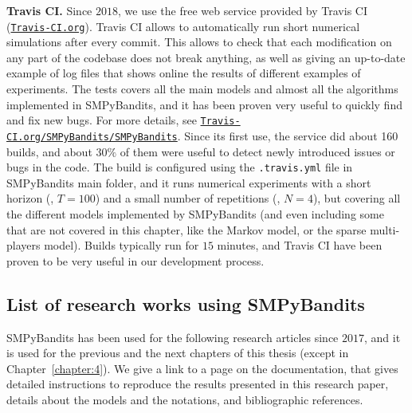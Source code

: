 \textbf{Travis CI.}
Since $2018$, we use the free web service provided by Travis CI (\href{https://travis-ci.org/}{\texttt{Travis-CI.org}}).
Travis CI allows to automatically run short numerical simulations after every commit.
This allows to check that each modification on any part of the codebase does not break anything, as well as giving an up-to-date example of log files that shows online the results of different examples of experiments. The tests covers all the main models and almost all the algorithms implemented in SMPyBandits, and it has been proven very useful to quickly find and fix new bugs.
For more details, see \href{https://travis-ci.org/SMPyBandits/SMPyBandits}{\texttt{Travis-CI.org/SMPyBandits/SMPyBandits}}.
%
Since its first use, the service did about 160 builds, and about $30\%$ of them were useful to detect newly introduced issues or bugs in the code.
The build is configured using the \texttt{.travis.yml} file in SMPyBandits main folder, and it runs numerical experiments with a short horizon (\eg, $T=100$) and a small number of repetitions (\ie, $N=4$), but covering all the different models implemented by SMPyBandits (and even including some that are not covered in this chapter, like the Markov model, or the sparse multi-players model).
Builds typically run for $15$ minutes, and Travis CI have been proven to be very useful in our development process.



\subsection{List of research works using SMPyBandits}

SMPyBandits has been used for the following research articles since $2017$, and it is used for the previous and the next chapters of this thesis (except in Chapter~\ref{chapter:4}).
%
We give a link to a page on the documentation, that gives detailed instructions to reproduce the results presented in this research paper, details about the models and the notations, and bibliographic references.

